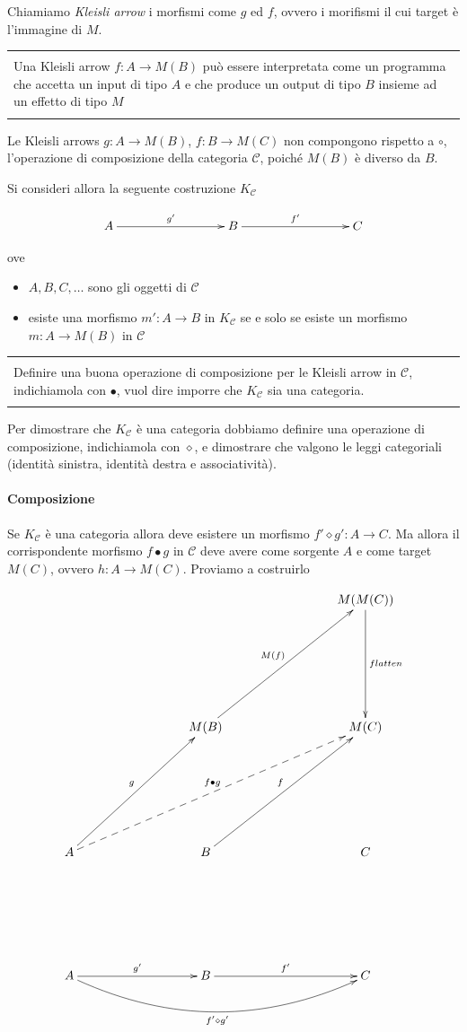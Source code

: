 \documentclass[12pt]{article}
\theoremstyle{definition}
\newenvironment{demo}
    {\begin{center}
    \begin{tabular}{|p{0.9\textwidth}|}
    \hline\\
    }
    {
    \\\\\hline
    \end{tabular}
    \end{center}
    }
\begin{document}
Chiamiamo \emph{Kleisli arrow} i morfismi come $g$ ed $f$, ovvero i morifismi il cui target è l'immagine di $M$.

\begin{demo}
Una Kleisli arrow $f: A \rightarrow M(B)$ può essere interpretata come un programma che accetta un input di tipo $A$ e che produce un output di tipo $B$ insieme ad un effetto di tipo $M$
\end{demo}

Le Kleisli arrows $g: A \rightarrow M(B)$, $f: B \rightarrow M(C)$ non compongono rispetto a $\circ$, l'operazione di composizione della categoria $\mathcal{C}$,
poiché $M(B)$ è diverso da $B$.

Si consideri allora la seguente costruzione $K_{\mathcal{C}}$

\[
\xymatrixrowsep{3cm}
\xymatrixcolsep{3cm}
\xymatrix{
  A \ar[r]^{g'} & B \ar[r]^{f'} & C
}
\]

ove

\begin{itemize}
  \item $A, B, C, \ldots$ sono gli oggetti di $\mathcal{C}$
  \item esiste una morfismo $m': A \rightarrow B$ in $K_{\mathcal{C}}$ se e solo se esiste un morfismo $m: A \rightarrow M(B)$ in $\mathcal{C}$
\end{itemize}

\begin{demo}
Definire una buona operazione di composizione per le Kleisli arrow in $\mathcal{C}$, indichiamola con $\bullet$, vuol dire imporre che $K_{\mathcal{C}}$ sia una categoria.
\end{demo}

Per dimostrare che $K_{\mathcal{C}}$ è una categoria dobbiamo definire una operazione di composizione, indichiamola con $\diamond$,
e dimostrare che valgono le leggi categoriali (identità sinistra, identità destra e associatività).

\paragraph{Composizione}

Se $K_{\mathcal{C}}$ è una categoria allora deve esistere un morfismo $f' \diamond g': A \rightarrow C$.
Ma allora il corrispondente morfismo $f \bullet g$ in $\mathcal{C}$ deve avere come sorgente $A$ e come target $M(C)$, ovvero $h: A \rightarrow M(C)$.
Proviamo a costruirlo

\[
\xymatrixrowsep{3cm}
\xymatrixcolsep{3cm}
\xymatrix{
  && M(M(C)) \ar[d]^{flatten} \\
  & M(B) \ar[ur]^{M(f)} & M(C) \\
  A \ar[ur]^g \ar@{-->}[urr]^{f \bullet g} & B \ar[ur]^f & C \\
  A \ar[r]^{g'} \ar@/_1cm/[rr]_{f' \diamond g'} & B \ar[r]^{f'} & C
}
\]
\end{document}
